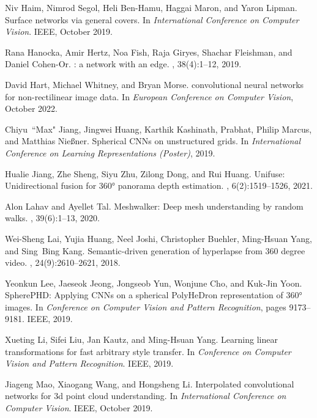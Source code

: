 \documentclass[10pt,twocolumn,letterpaper]{article}
\begin{document}
\begin{thebibliography}{10}
Niv Haim, Nimrod Segol, Heli Ben-Hamu, Haggai Maron, and Yaron Lipman.
\newblock Surface networks via general covers.
\newblock In {\em International Conference on Computer Vision}. IEEE, October
  2019.

Rana Hanocka, Amir Hertz, Noa Fish, Raja Giryes, Shachar Fleishman, and Daniel
  Cohen-Or.
: a network with an edge.
, 38(4):1--12, 2019.

David Hart, Michael Whitney, and Bryan Morse.
 convolutional neural networks for non-rectilinear
  image data.
\newblock In {\em European Conference on Computer Vision}, October 2022.

Chiyu~``Max" Jiang, Jingwei Huang, Karthik Kashinath, Prabhat, Philip Marcus,
  and Matthias Nie{\ss}ner.
\newblock Spherical {CNNs} on unstructured grids.
\newblock In {\em International Conference on Learning Representations
  (Poster)}, 2019.

Hualie Jiang, Zhe Sheng, Siyu Zhu, Zilong Dong, and Rui Huang.
\newblock Unifuse: Unidirectional fusion for 360° panorama depth estimation.
, 6(2):1519--1526, 2021.

Alon Lahav and Ayellet Tal.
\newblock Meshwalker: Deep mesh understanding by random walks.
, 39(6):1--13, 2020.

Wei-Sheng Lai, Yujia Huang, Neel Joshi, Christopher Buehler, Ming-Hsuan Yang,
  and Sing~Bing Kang.
\newblock Semantic-driven generation of hyperlapse from 360 degree video.
,
  24(9):2610--2621, 2018.

Yeonkun Lee, Jaeseok Jeong, Jongseob Yun, Wonjune Cho, and Kuk-Jin Yoon.
\newblock Sphere{PHD}: Applying {CNN}s on a spherical {PolyHeDron}
  representation of 360° images.
\newblock In {\em Conference on Computer Vision and Pattern Recognition}, pages
  9173--9181. IEEE, 2019.

Xueting Li, Sifei Liu, Jan Kautz, and Ming-Hsuan Yang.
\newblock Learning linear transformations for fast arbitrary style transfer.
\newblock In {\em Conference on Computer Vision and Pattern Recognition}. IEEE,
  2019.

Jiageng Mao, Xiaogang Wang, and Hongsheng Li.
\newblock Interpolated convolutional networks for 3d point cloud understanding.
\newblock In {\em International Conference on Computer Vision}. IEEE, October
  2019.


\end{thebibliography}
\end{document}
